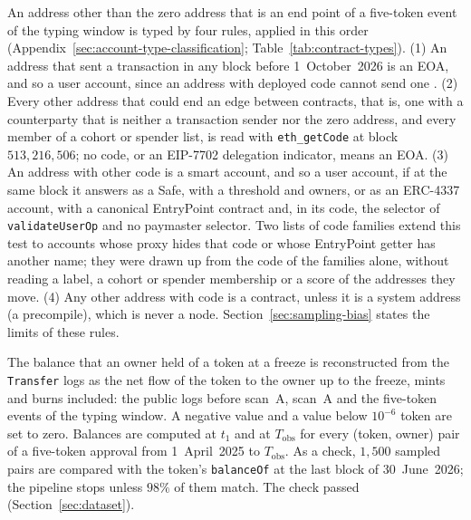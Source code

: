 
An address other than the zero address that is an end point of a five-token event of the typing window is typed by four rules, applied in this order (Appendix~\ref{sec:account-type-classification}; Table~\ref{tab:contract-types}). (1) An address that sent a transaction in any block before 1~October~2026 is an EOA, and so a user account, since an address with deployed code cannot send one \parencite{feist2021eip3607}. (2) Every other address that could end an edge between contracts, that is, one with a counterparty that is neither a transaction sender nor the zero address, and every member of a cohort or spender list, is read with \texttt{eth\_getCode} at block $513{,}216{,}506$; no code, or an EIP-7702 delegation indicator, means an EOA. (3) An address with other code is a smart account, and so a user account, if at the same block it answers as a Safe, with a threshold and owners, or as an ERC-4337 account, with a canonical EntryPoint contract and, in its code, the selector of \texttt{validateUserOp} and no paymaster selector. Two lists of code families extend this test to accounts whose proxy hides that code or whose EntryPoint getter has another name; they were drawn up from the code of the families alone, without reading a label, a cohort or spender membership or a score of the addresses they move. (4) Any other address with code is a contract, unless it is a system address (a precompile), which is never a node. Section~\ref{sec:sampling-bias} states the limits of these rules.


The balance that an owner held of a token at a freeze is reconstructed from the \texttt{Transfer} logs as the net flow of the token to the owner up to the freeze, mints and burns included: the public logs before scan~A, scan~A and the five-token events of the typing window. A negative value and a value below $10^{-6}$ token are set to zero. Balances are computed at $t_1$ and at $T_{\mathrm{obs}}$ for every (token, owner) pair of a five-token approval from 1~April~2025 to $T_{\mathrm{obs}}$. As a check, $1{,}500$ sampled pairs are compared with the token's \texttt{balanceOf} at the last block of 30~June~2026; the pipeline stops unless $98\%$ of them match. The check passed (Section~\ref{sec:dataset}).


